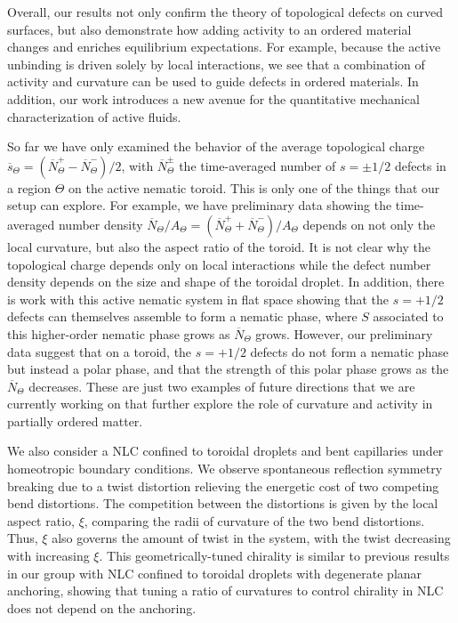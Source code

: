 Overall, our results not only confirm the theory of topological defects on curved surfaces, but also demonstrate how adding activity to an ordered material changes and enriches equilibrium expectations.
For example, because the active unbinding is driven solely by local interactions, we see that a combination of activity and curvature can be used to guide defects in ordered materials.
In addition, our work introduces a new avenue for the quantitative mechanical characterization of active fluids.

So far we have only examined the behavior of the average topological charge $\overbar{s}_{\Theta} = (\overbar{N}^{+}_{\Theta} - \overbar{N}^{-}_{\Theta})/2$, with $\overbar{N}^{\pm}_{\Theta}$ the time-averaged number of $s = \pm1/2$ defects in a region $\Theta$ on the active nematic toroid.
This is only one of the things that our setup can explore.
For example, we have preliminary data showing the time-averaged number density $\overbar{N}_{\Theta}/A_{\Theta} = (\overbar{N}^{+}_{\Theta} + \overbar{N}^{-}_{\Theta})/A_{\Theta}$ depends on not only the local curvature, but also the aspect ratio of the toroid.
It is not clear why the topological charge depends only on local interactions while the defect number density depends on the size and shape of the toroidal droplet.
In addition, there is work with this active nematic system in flat space showing that the $s = +1/2$ defects can themselves assemble to form a nematic phase, where $S$ associated to this higher-order nematic phase grows as $\overbar{N}_{\Theta}$ grows.
However, our preliminary data suggest that on a toroid, the $s = +1/2$ defects do not form a nematic phase but instead a polar phase, and that the strength of this polar phase grows as the $\overbar{N}_{\Theta}$ decreases.
These are just two examples of future directions that we are currently working on that further explore the role of curvature and activity in partially ordered matter.

We also consider a NLC confined to toroidal droplets and bent capillaries under homeotropic boundary conditions.
We observe spontaneous reflection symmetry breaking due to a twist distortion relieving the energetic cost of two competing bend distortions.
The competition between the distortions is given by the local aspect ratio, $\xi$, comparing the radii of curvature of the two bend distortions.
Thus, $\xi$ also governs the amount of twist in the system, with the twist decreasing with increasing $\xi$.
This geometrically-tuned chirality is similar to previous results in our group with NLC confined to toroidal droplets with degenerate planar anchoring, showing that tuning a ratio of curvatures to control chirality in NLC does not depend on the anchoring.

